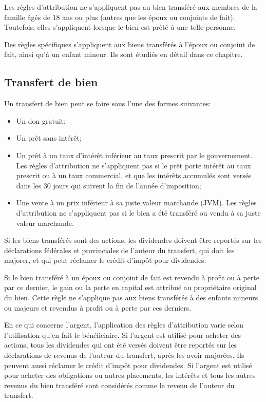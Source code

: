 Les règles d'attribution ne s'appliquent pas au bien transféré aux membres de la famille âgés de 18 ans ou plus (autres que les époux ou conjoints de fait). Toutefois, elles s'appliquent lorsque le bien est prêté à une telle personne.

Des règles spécifiques s'appliquent aux biens transférés à l'époux ou conjoint de fait, ainsi qu'à un enfant mineur. Ils sont étudiés en détail dans ce chapitre.


\subsection{Transfert de bien}
Un transfert de bien peut se faire sous l'une des formes suivantes:
\begin{itemize}
	\item Un don gratuit;
	\item Un prêt sans intérêt;
	\item Un prêt à un taux d'intérêt inférieur au taux prescrit par le gouvernement. Les règles d'attribution ne s'appliquent pas si le prêt porte intérêt au taux prescrit ou à un taux commercial, et que les intérêts accumulés sont versés dans les 30 jours qui suivent la fin de l'année d'imposition;
	\item Une vente à un prix inférieur à sa juste valeur marchande (JVM). Les règles d'attribution ne s'appliquent pas si le bien a été transféré ou vendu à sa juste valeur marchande.
\end{itemize}

Si les biens transférés sont des actions, les dividendes doivent être reportés sur les déclarations fédérales et provinciales de l'auteur du transfert, qui doit les majorer, et qui peut réclamer le crédit d'impôt pour dividendes.

Si le bien transféré à un époux ou conjoint de fait est revendu à profit ou à perte par ce dernier, le gain ou la perte en capital est attribué au propriétaire original du bien. Cette règle ne s'applique pas aux biens transférés à des enfants mineurs ou majeurs et revendus à profit ou à perte par ces derniers.

En ce qui concerne l'argent, l'application des règles d'attribution varie selon l'utilisation qu'en fait le bénéficiaire. Si l'argent est utilisé pour acheter des actions, tous les dividendes qui ont été versés doivent être reportés sur les déclarations de revenus de l'auteur du transfert, après les avoir majorées. Ils peuvent aussi réclamer le crédit d'impôt pour dividendes. Si l'argent est utilisé pour acheter des obligations ou autres placements, les intérêts et tous les autres revenus du bien transféré sont considérés comme le revenu de l'auteur du transfert.

